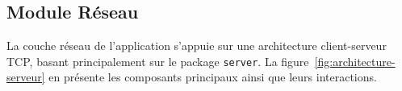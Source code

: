 \documentclass[a4paper]{article}
\begin{document}
\subsection{Module Réseau}
\label{sec:reseau}
 
La couche réseau de l'application s'appuie sur une architecture client-serveur
TCP, basant principalement sur le package
\texttt{server}.
La figure~\ref{fig:architecture-serveur} en présente les composants principaux
ainsi que leurs interactions.

\end{document}
